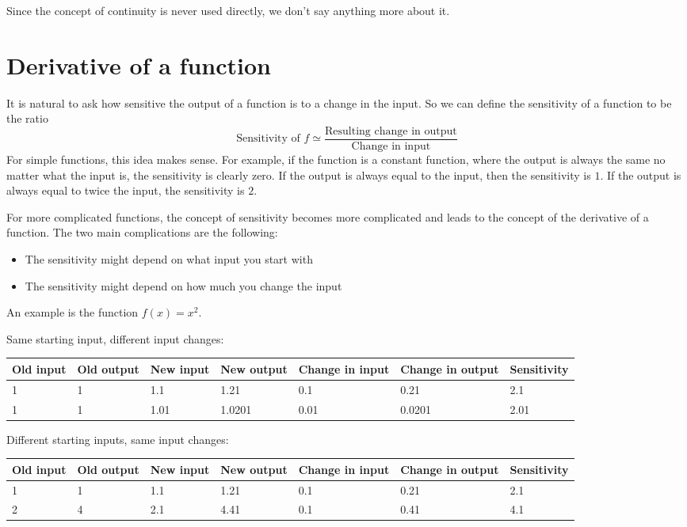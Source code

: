 \documentclass{math-deane}
\begin{document}
Since the concept of continuity is never used directly, we don't say anything more about it.

\section{Derivative of a function}

It is natural to ask how sensitive the output of a function is to a change in the input. So we can define the sensitivity of a function to be the ratio
\[
\text{Sensitivity of }f \simeq \frac{\text{Resulting change in output}}{\text{Change in input}}
\]
For simple functions, this idea makes sense. For example, if the function is a constant function, where the output is always the same no matter what the input is, the sensitivity is clearly zero. If the output is always equal to the input, then the sensitivity is $1$. If the output is always equal to twice the input, the sensitivity is $2$.

For more complicated functions, the concept of sensitivity becomes more complicated and leads to the concept of the derivative of a function. The two main complications are the following:
\begin{itemize}
\item The sensitivity might depend on what input you start with
\item The sensitivity might depend on how much you change the input
\end{itemize}

An example is the function $f(x) = x^2$. 

\vspace{0.1in}

Same starting input, different input changes:\\
\begin{tabular}{|p{0.75in}|p{0.75in}|p{0.75in}|p{0.75in}|p{0.75in}|p{1in}|p{1in}|}
\hline
Old input&Old output&New input& New output & Change in input &
Change in output & Sensitivity \\ \hline
1 & 1 & 1.1 & 1.21 & 0.1 & 0.21 & 2.1\\
1 & 1 & 1.01 & 1.0201 & 0.01 & 0.0201 & 2.01\\ \hline
\end{tabular}

Different starting inputs, same input changes:\\
\begin{tabular}{|p{0.75in}|p{0.75in}|p{0.75in}|p{0.75in}|p{0.75in}|p{1in}|p{1in}|}
\hline
Old input&Old output&New input& New output & Change in input &
Change in output & Sensitivity \\ \hline
1 & 1 & 1.1 & 1.21 & 0.1 & 0.21 & 2.1\\
2 & 4 & 2.1 & 4.41 & 0.1 & 0.41 & 4.1 \\ \hline
\end{tabular}
\end{document}
